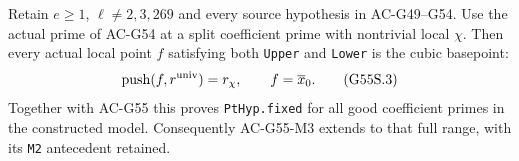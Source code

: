 \begin{theorem}
\label{AC-G55-split}
Retain $e\geq1$, $\ell\ne2,3,269$ and every
source hypothesis in AC-G49--G54.
Use the actual prime of AC-G54 at a split
coefficient prime with nontrivial local $\chi$.
Then every actual local point $f$ satisfying
both \texttt{Upper} and \texttt{Lower} is the
cubic basepoint:
\[
             \operatorname{push}(f,r^{\rm univ})=r_\chi,
                        \qquad f=\overline x_0 .
                                                               \tag{G55S.3}
\]
Together with AC-G55 this proves
\texttt{PtHyp.fixed} for all good coefficient
primes in the constructed model.
Consequently AC-G55-M3 extends to that full
range, with its \texttt{M2} antecedent retained.
\end{theorem}
